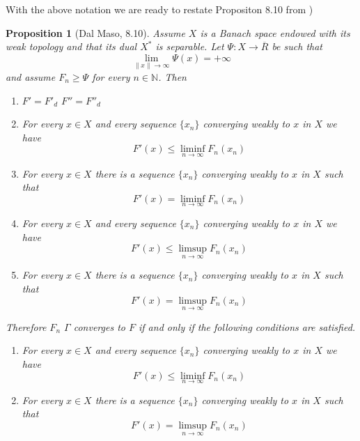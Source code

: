 \documentclass[11pt]{article}
\newcommand{\N}{\mathbb{N}}
\theoremstyle{plain}
\newtheorem*{Proposition*}{Proposition}
\begin{document}
With the above notation we are ready to restate Propositon 8.10 from \cite{dal2012introduction})
\begin{Proposition*}[Dal Maso, 8.10]
Assume $X$ is a Banach space endowed with its weak topology and that its dual $X^*$ is separable. Let $\Psi : X \rightarrow \overline{R}$ be such that
\[ \lim_{\| x\| \to \infty} \Psi(x) = +\infty\]
and assume $F_n \geq \Psi$ for every $n \in \N$. Then
\begin{enumerate}
\item $F' = F'_d$ \quad $F''= F''_d$
\item For every $x \in X$ and every sequence $\{x_n\}$ converging weakly to $x$ in $X$ we have
\[ F'(x) \leq \liminf_{n \to \infty} F_n(x_n)\]
\item For every $x \in X$ there is a sequence $\{x_n\}$ converging weakly to $x$ in $X$ such that
\[ F'(x) = \liminf_{n \to \infty} F_n(x_n)\]
\item For every $x \in X$ and every sequence $\{x_n\}$ converging weakly to $x$ in $X$ we have
\[ F'(x) \leq \limsup_{n \to \infty} F_n(x_n)\]
\item For every $x \in X$ there is a sequence $\{x_n\}$ converging weakly to $x$ in $X$ such that
\[ F'(x) = \limsup_{n \to \infty} F_n(x_n)\]
\end{enumerate}
Therefore $F_n$ $\Gamma$ converges to $F$ if and only if the following conditions are satisfied.
\begin{enumerate}
\item  For every $x \in X$ and every sequence $\{x_n\}$ converging weakly to $x$ in $X$ we have
\[ F'(x) \leq \liminf_{n \to \infty} F_n(x_n)\]
\item For every $x \in X$ there is a sequence $\{x_n\}$ converging weakly to $x$ in $X$ such that
\[ F'(x) = \limsup_{n \to \infty} F_n(x_n)\]
\end{enumerate}
\end{Proposition*}





\end{document}
